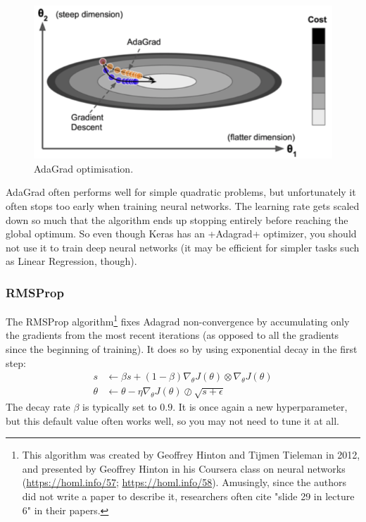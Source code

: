 \begin{figure}
\centering
\includegraphics[scale=0.5]{img/adagrad}
\caption{AdaGrad optimisation.}
\label{fig:adagrad}
\end{figure}
AdaGrad often performs well for simple quadratic problems, but unfortunately it often stops too early when training neural networks. The learning rate gets scaled down so much that the algorithm ends up stopping entirely before reaching the global optimum. So even though Keras has an \cd+Adagrad+ optimizer, you should not use it to train deep neural networks (it may be efficient for simpler tasks such as Linear Regression, though). 

\subsubsection{RMSProp}
\label{subsec:RMSprop}
The RMSProp algorithm\footnote{This algorithm was created by Geoffrey Hinton and Tijmen Tieleman in 2012, and presented by Geoffrey Hinton in his Coursera class on neural networks (\href{slides}{https://homl.info/57}; \href{video}{https://homl.info/58}). Amusingly, since the authors did not write a paper to describe it, researchers often cite "slide 29 in lecture 6" in their papers.} fixes Adagrad non-convergence by accumulating only the gradients from the most recent iterations (as opposed to all the gradients since the beginning of training). It does so by using exponential decay in the first step:
\begin{equation}
\begin{aligned}
s &\leftarrow \beta s + (1-\beta) \nabla_\theta J(\theta) \otimes \nabla_\theta J(\theta)\\
\theta &\leftarrow \theta - \eta \nabla_\theta J(\theta) \oslash \sqrt{s+\epsilon}
\end{aligned}
\end{equation}
The decay rate $\beta$ is typically set to $0.9$. It is once again a new hyperparameter, but this default value often works well, so you may not need to tune it at all.

